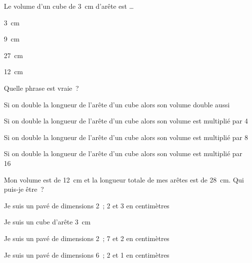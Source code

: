     
\begin{QCM}
  \begin{GroupeQCM}
      
    \begin{exercice}
      Le volume d'un cube de 3 cm d'arête est \ldots
      \begin{ChoixQCM}{4}
      \item 3 cm
      \item 9 cm
      \item 27 cm
      \item 12 cm
      \end{ChoixQCM}
\begin{corrige}
   \end{corrige}
    \end{exercice}


    \begin{exercice}
      Quelle phrase est vraie ?
      \begin{ChoixQCM}{4}
      \item Si on double la longueur de l'arête d'un cube alors son volume double aussi
      \item Si on double la longueur de l'arête d'un cube alors son volume est multiplié par 4
      \item Si on double la longueur de l'arête d'un cube alors son volume est multiplié par 8
      \item Si on double la longueur de l'arête d'un cube alors son volume est multiplié par 16
      \end{ChoixQCM}
\begin{corrige}
   \end{corrige}
    \end{exercice}
    
    
    \begin{exercice}
      Mon volume est de 12 cm et la longueur totale de mes arêtes est de 28 cm. Qui puis‑je être ?
      \begin{ChoixQCM}{4}
      \item Je suis un pavé de dimensions  2 ; 2 et 3 en centimètres
      \item Je suis un cube d'arête 3 cm
      \item Je suis un pavé de dimensions 2 ; 7 et 2 en centimètres
      \item Je suis un pavé de dimensions  6 ; 2 et 1 en centimètres
      \end{ChoixQCM}
\begin{corrige}
   \end{corrige}
    \end{exercice}


\end{GroupeQCM}
\end{QCM}

  
